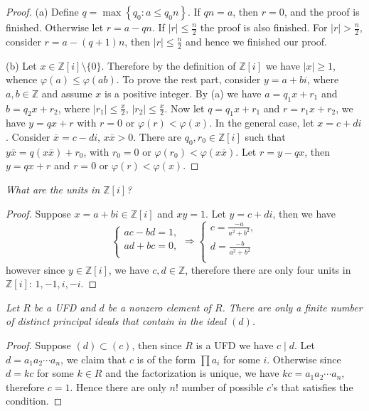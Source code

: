 \begin{proof}
(a) Define $q=\max \left\{ q_0:a\le q_0n \right\} $. If $qn=a$, then $r=0$, and the proof is finished. Otherwise let $r=a-qn$. If $|r|\le\frac{n}{2}$ the proof is also finished. For $|r|>\frac{n}{2}$, consider $r=a-(q+1)n$, then $|r|\le\frac{n}{2}$ and hence we finished our proof.\par
(b) Let $x\in\mathbb{Z}[i]\setminus\{0\}$. Therefore by the definition of $\mathbb{Z}[i]$ we have $|x|\ge 1$, whence $\varphi(a)\le\varphi(ab)$. To prove the rest part, consider $y=a+bi$, where $a,b\in\mathbb{Z}$ and assume $x$ is a positive integer. By (a) we have $a=q_1x+r_1$ and $b=q_2x+r_2$, where $|r_1|\le\frac{x}{2}$, $|r_2|\le\frac{x}{2}$. Now let $q=q_1x+r_1$ and $r=r_1x+r_2$, we have $y=qx+r$ with $r=0$ or $\varphi(r)<\varphi(x)$. In the general case, let $x=c+di$. Consider $\overline{x}=c-di$, $x\overline{x}>0$. There are $q_0,r_0\in\mathbb{Z}[i]$ such that $y\overline{x}=q(x\overline{x})+r_0$, with $r_0=0$ or $\varphi(r_0)<\varphi(x\overline{x})$. Let $r=y-qx$, then $y=qx+r$ and $r=0$ or $\varphi(r)<\varphi(x)$.
\end{proof}
\begin{problem}\em
What are the units in $\mathbb{Z}[i]$?
\end{problem}
\begin{proof}
Suppose $x=a+bi\in\mathbb{Z}[i]$ and $xy=1$. Let $y=c+di$, then we have 
$$
\begin{cases}
	ac-bd=1,\\
	ad+bc=0,\\
\end{cases}\Rightarrow \left\{ \begin{array}{c}
	c=\frac{-a}{a^2+b^2},\\
	d=\frac{-b}{a^2+b^2}\\
\end{array} \right. 
$$
however since $y\in\mathbb{Z}[i]$, we have $c,d\in\mathbb{Z}$, therefore there are only four units in $\mathbb{Z}[i]$: $1,-1,i,-i$.
\end{proof}
\begin{problem}\em
Let $R$ be a UFD and $d$ be a nonzero element of $R$. There are only a finite number of distinct principal ideals that contain in the ideal $(d)$.
\end{problem}
\begin{proof}
Suppose $(d)\subset (c)$, then since $R$ is a UFD we have $c\mid d$. Let $d=a_1a_2\cdots a_n$, we claim that $c$ is of the form $\prod a_i$ for some $i$. Otherwise since $d=kc$ for some $k\in R$ and the factorization is unique, we have $kc=a_1a_2\cdots a_n$, therefore $c=1$. Hence there are only $n!$ number of possible $c$'s that satisfies the condition.
\end{proof}
